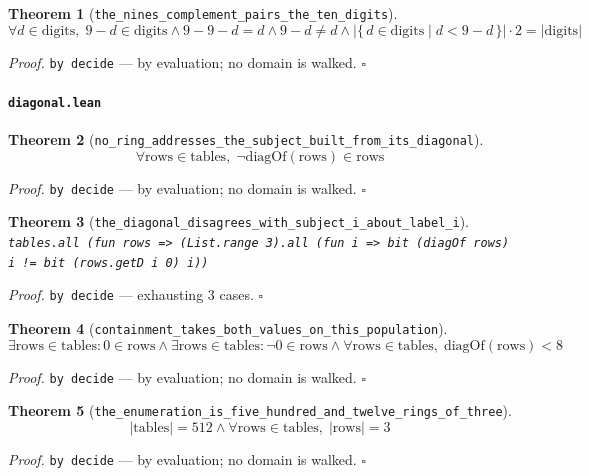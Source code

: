 \documentclass[11pt]{article}
\newtheorem{theorem}{Theorem}[section]
\begin{document}
\begin{theorem}[\texttt{the\_nines\_complement\_pairs\_the\_ten\_digits}]
\[ \forall d \in \mathrm{digits},\; 9 - d \in \mathrm{digits} \land 9 - 9 - d = d \land 9 - d \neq d \land \left|\{\, d \in \mathrm{digits} \mid d < 9 - d \,\}\right| \cdot 2 = \left|\mathrm{digits}\right| \]
\end{theorem}
\noindent\emph{Proof.} \texttt{by decide} --- by evaluation; no domain is walked. \hfill$\square$

\paragraph{\texttt{diagonal.lean}}

\begin{theorem}[\texttt{no\_ring\_addresses\_the\_subject\_built\_from\_its\_diagonal}]
\[ \forall \mathrm{rows} \in \mathrm{tables},\; \lnot \mathrm{diagOf}\mathopen{}\left(\mathrm{rows}\right) \in \mathrm{rows} \]
\end{theorem}
\noindent\emph{Proof.} \texttt{by decide} --- by evaluation; no domain is walked. \hfill$\square$

\begin{theorem}[\texttt{the\_diagonal\_disagrees\_with\_subject\_i\_about\_label\_i}]
\texttt{tables.all (fun rows => (List.range 3).all (fun i => bit (diagOf rows) i != bit (rows.getD i 0) i))}
\end{theorem}
\noindent\emph{Proof.} \texttt{by decide} --- exhausting 3 cases. \hfill$\square$

\begin{theorem}[\texttt{containment\_takes\_both\_values\_on\_this\_population}]
\[ \exists \mathrm{rows} \in \mathrm{tables} : 0 \in \mathrm{rows} \land \exists \mathrm{rows} \in \mathrm{tables} : \lnot 0 \in \mathrm{rows} \land \forall \mathrm{rows} \in \mathrm{tables},\; \mathrm{diagOf}\mathopen{}\left(\mathrm{rows}\right) < 8 \]
\end{theorem}
\noindent\emph{Proof.} \texttt{by decide} --- by evaluation; no domain is walked. \hfill$\square$

\begin{theorem}[\texttt{the\_enumeration\_is\_five\_hundred\_and\_twelve\_rings\_of\_three}]
\[ \left|\mathrm{tables}\right| = 512 \land \forall \mathrm{rows} \in \mathrm{tables},\; \left|\mathrm{rows}\right| = 3 \]
\end{theorem}
\noindent\emph{Proof.} \texttt{by decide} --- by evaluation; no domain is walked. \hfill$\square$
\end{document}
